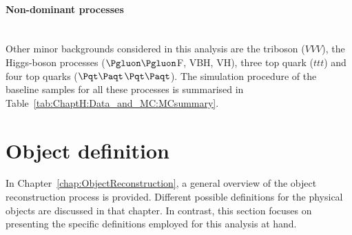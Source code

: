\paragraph{Non-dominant processes}\mbox{}\\
Other minor backgrounds considered in this analysis are the triboson ($VVV$), 
the Higgs-boson processes ($\Pgluon\Pgluon$F, VBH, VH), three top quark ($t$$t$$t$)
and four top quarks ($\ttbar$$\ttbar$). The simulation procedure of the baseline samples for all these 
processes is summarised in Table~\ref{tab:ChaptH:Data_and_MC:MCsummary}.






\section{Object definition}
\label{sec:ChaptH:ObjectDefReco}
In Chapter~\ref{chap:ObjectReconstruction}, a general overview of the object 
reconstruction process is provided. Different possible definitions for the 
physical objects are discussed in that chapter. 
In contrast, this section focuses on presenting the 
specific definitions employed for this analysis at hand.




